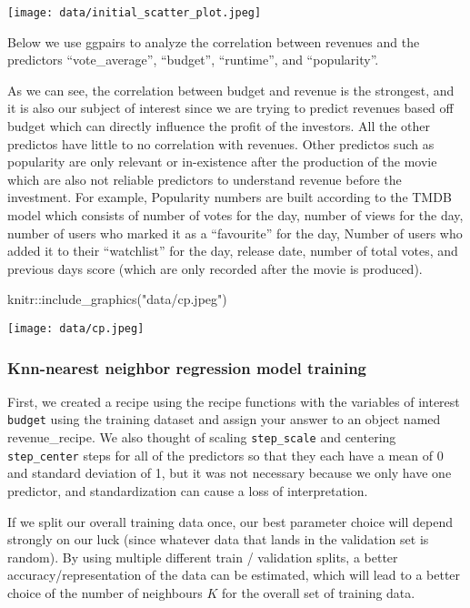 \documentclass[
]{article}
\newenvironment{Shaded}{\begin{snugshade}}{\end{snugshade}}
\newcommand{\FunctionTok}[1]{\textcolor[rgb]{0.00,0.00,0.00}{#1}}
\newcommand{\NormalTok}[1]{#1}
\newcommand{\SpecialCharTok}[1]{\textcolor[rgb]{0.00,0.00,0.00}{#1}}
\newcommand{\StringTok}[1]{\textcolor[rgb]{0.31,0.60,0.02}{#1}}
\begin{document}
\texttt{[image: data/initial\_scatter\_plot.jpeg]}

Below we use ggpairs to analyze the correlation between revenues and the
predictors ``vote\_average'', ``budget'', ``runtime'', and
``popularity''.

As we can see, the correlation between budget and revenue is the
strongest, and it is also our subject of interest since we are trying to
predict revenues based off budget which can directly influence the
profit of the investors. All the other predictos have little to no
correlation with revenues. Other predictos such as popularity are only
relevant or in-existence after the production of the movie which are
also not reliable predictors to understand revenue before the
investment. For example, Popularity numbers are built according to the
TMDB model which consists of number of votes for the day, number of
views for the day, number of users who marked it as a ``favourite'' for
the day, Number of users who added it to their ``watchlist'' for the
day, release date, number of total votes, and previous days score (which
are only recorded after the movie is produced).

\begin{Shaded}
\begin{Highlighting}[]
\NormalTok{ knitr}\SpecialCharTok{::}\FunctionTok{include\_graphics}\NormalTok{(}\StringTok{"data/cp.jpeg"}\NormalTok{)}
\end{Highlighting}
\end{Shaded}

\texttt{[image: data/cp.jpeg]}

\hypertarget{knn-nearest-neighbor-regression-model-training}{%
\subsubsection{Knn-nearest neighbor regression model
training}\label{knn-nearest-neighbor-regression-model-training}}

First, we created a recipe using the recipe functions with the variables
of interest \texttt{budget} using the training dataset and assign your
answer to an object named revenue\_recipe. We also thought of scaling
\texttt{step\_scale} and centering \texttt{step\_center} steps for all
of the predictors so that they each have a mean of 0 and standard
deviation of 1, but it was not necessary because we only have one
predictor, and standardization can cause a loss of interpretation.

If we split our overall training data once, our best parameter choice
will depend strongly on our luck (since whatever data that lands in the
validation set is random). By using multiple different train /
validation splits, a better accuracy/representation of the data can be
estimated, which will lead to a better choice of the number of
neighbours \(K\) for the overall set of training data.
\end{document}
